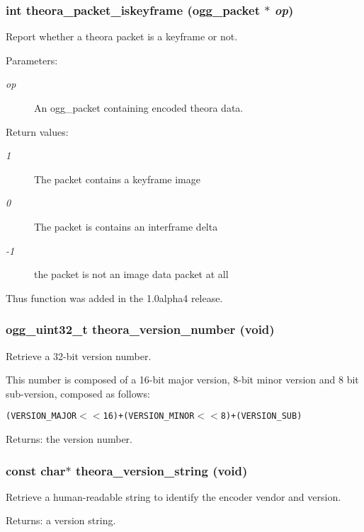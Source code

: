 \subsubsection{\setlength{\rightskip}{0pt plus 5cm}int theora\_\-packet\_\-iskeyframe (ogg\_\-packet $\ast$ {\em op})}\label{theora_8h_a26}


Report whether a theora packet is a keyframe or not. 

\begin{Desc}
\item[Parameters:]
\begin{description}
\item[{\em op}]An ogg\_\-packet containing encoded theora data. \end{description}
\end{Desc}
\begin{Desc}
\item[Return values:]
\begin{description}
\item[{\em 1}]The packet contains a keyframe image \item[{\em 0}]The packet is contains an interframe delta \item[{\em -1}]the packet is not an image data packet at all\end{description}
\end{Desc}
Thus function was added in the 1.0alpha4 release. 
\subsubsection{\setlength{\rightskip}{0pt plus 5cm}ogg\_\-uint32\_\-t theora\_\-version\_\-number (void)}\label{theora_8h_a14}


Retrieve a 32-bit version number. 

This number is composed of a 16-bit major version, 8-bit minor version and 8 bit sub-version, composed as follows: \small\begin{alltt}
   (VERSION\_MAJOR$<$$<$16) + (VERSION\_MINOR$<$$<$8) + (VERSION\_SUB)
\end{alltt}\normalsize 
 \begin{Desc}
\item[Returns:]the version number. \end{Desc}
\subsubsection{\setlength{\rightskip}{0pt plus 5cm}const char$\ast$ theora\_\-version\_\-string (void)}\label{theora_8h_a13}


Retrieve a human-readable string to identify the encoder vendor and version. 

\begin{Desc}
\item[Returns:]a version string. \end{Desc}

